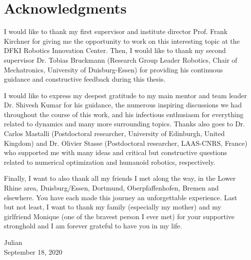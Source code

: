 \thispagestyle{empty}
\chapter*{Acknowledgments}
 
I would like to thank my first supervisor and institute director Prof. Frank Kirchner for giving me the opportunity to work on this interesting topic at the DFKI Robotics Innovation Center. Then, I would like to thank my second supervisor Dr. Tobias Bruckmann (Research Group Leader Robotics, Chair of Mechatronics, University of Duisburg-Essen) for providing his continuous guidance and constructive feedback during this thesis.   

I would like to express my deepest gratitude to my main mentor and team leader Dr. Shivesh Kumar for his guidance, the numerous inspiring discussions we had throughout the course of this work, and his infectious enthusiasm for everything related to dynamics and many more surrounding topics. Thanks also goes to Dr. Carlos Mastalli (Postdoctoral researcher, University of Edinburgh, United Kingdom) and Dr. Olivier Stasse (Postdoctoral researcher, LAAS-CNRS, France) who supported me with many ideas and critical but constructive questions related to numerical optimization and humanoid robotics, respectively. 

Finally, I want to also thank all my friends I met along the way, in the Lower Rhine area, Duisburg/Essen, Dortmund, %
Oberpfaffenhofen, Bremen and elsewhere. You have each made this journey an unforgettable experience. Last but not least, I want to thank my family (especially my mother) and my girlfriend Monique (one of the bravest person I ever met) for your supportive stronghold and I am forever grateful to have you in my life. 


\bigskip

\begin{flushright}
{\Large Julian} \\
\bigskip
September 18, 2020
\end{flushright}










